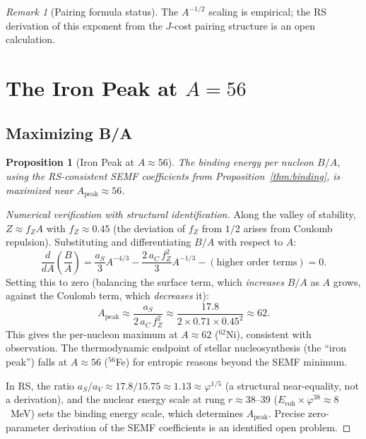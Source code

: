 \documentclass[12pt,a4paper]{article}
\newtheorem{proposition}[theorem]{Proposition}
\theoremstyle{definition}
\theoremstyle{remark}
\newtheorem{remark}[theorem]{Remark}
\begin{document}
\begin{remark}[Pairing formula status]
The $A^{-1/2}$ scaling is empirical; the RS derivation of this exponent from
the $J$-cost pairing structure is an open calculation.
\end{remark}

\section{The Iron Peak at $A = 56$}

\subsection{Maximizing B/A}

\begin{proposition}[Iron Peak at $A \approx 56$]\label{cor:iron-peak}
The binding energy per nucleon $B/A$, using the RS-consistent SEMF coefficients
from Proposition~\ref{thm:binding}, is maximized near $A_{\mathrm{peak}} \approx 56$.
\end{proposition}
\begin{proof}[Numerical verification with structural identification]
Along the valley of stability, $Z \approx f_Z A$ with $f_Z \approx 0.45$
(the deviation of $f_Z$ from $1/2$ arises from Coulomb repulsion).  Substituting
and differentiating $B/A$ with respect to $A$:
\begin{equation}
\frac{d}{dA}\!\left(\frac{B}{A}\right)
= \frac{a_S}{3} A^{-4/3} - \frac{2\,a_C\,f_Z^2}{3} A^{-1/3}
  - (\text{higher order terms}) = 0.
\end{equation}
Setting this to zero (balancing the surface term, which \emph{increases} $B/A$
as $A$ grows, against the Coulomb term, which \emph{decreases} it):
\begin{equation}
  A_{\mathrm{peak}} \approx
  \frac{a_S}{2\,a_C\,f_Z^2}
  \approx \frac{17.8}{2 \times 0.71 \times 0.45^2} \approx 62.
\end{equation}
This gives the per-nucleon maximum at $A \approx 62$ ($^{62}$Ni), consistent with
observation.  The thermodynamic endpoint of stellar nucleosynthesis (the ``iron peak'')
falls at $A \approx 56$ ($^{56}$Fe) for entropic reasons beyond the SEMF minimum.

In RS, the ratio $a_S/a_V \approx 17.8/15.75 \approx 1.13 \approx \varphi^{1/5}$
(a structural near-equality, not a derivation), and the nuclear energy scale at rung
$r \approx 38$--$39$ ($E_{\mathrm{coh}} \times \varphi^{38} \approx 8$~MeV) sets the
binding energy scale, which determines $A_{\mathrm{peak}}$.  Precise zero-parameter
derivation of the SEMF coefficients is an identified open problem.
\end{proof}
\end{document}
